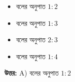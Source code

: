 \documentclass[12pt, a4paper]{article}
\begin{document}
\begin{itemize}[label={}, leftmargin=1cm, itemsep=0.5em]
\item[\textbf{A)}] বলের অনুপাত $1 : 2$
\item[\textbf{B)}] বলের অনুপাত $1 : 3$
\item[\textbf{C)}] বলের অনুপাত $2 : 3$
\item[\textbf{D)}] বলের অনুপাত $1 : 4$
\end{itemize}

\vspace{0.5em}
\begin{tcolorbox}[answerbox]
\textbf{\color{success} উত্তর:} A) বলের অনুপাত $1 : 2$
\end{tcolorbox}
\vspace{1em}
\end{document}
